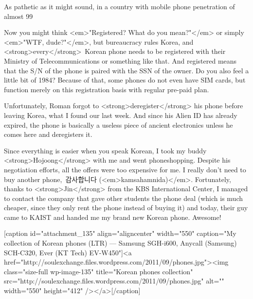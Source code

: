 \begin{post}
	\begin{content}
As pathetic as it might sound, in a country with mobile phone penetration of almost 99%



Now you might think <em>"Registered? What do you mean?"</em> or simply <em>"WTF, dude?"</em>, but bureaucracy rules Korea, and <strong>every</strong> Korean phone needs to be registered with their Ministry of Telecommunications or something like that. And registered means that the S/N of the phone is paired with the SSN of the owner. Do you also feel a little bit of 1984? Because of that, some phones do not even have SIM cards, but function merely on this registration basis with regular pre-paid plan.



Unfortunately, Roman forgot to <strong>deregister</strong> his phone before leaving Korea, what I found our last week. And since his Alien ID has already expired, the phone is basically a useless piece of ancient electronics unless he comes here and deregisters it.



Since everything is easier when you speak Korean, I took my buddy <strong>Hojoong</strong> with me and went phoneshopping. Despite his negotiation efforts, all the offers were too expensive for me. I really don't need to buy another phone, 감사합니다 (<em>kamsahamnida)</em>. Fortunately, thanks to <strong>Jin</strong> from the KBS International Center, I managed to contact the company that gave other students the phone deal (which is much cheaper, since they only rent the phone instead of buying it) and today, their guy came to KAIST and handed me my brand new Korean phone. Awesome!



[caption id="attachment_135" align="aligncenter" width="550" caption="My collection of Korean phones (LTR) — Samsung SGH-i600, Anycall (Samsung) SCH-C320, Ever (KT Tech) EV-W450"]<a href="http://soulexchange.files.wordpress.com/2011/09/phones.jpg"><img class="size-full wp-image-135" title="Korean phones collection" src="http://soulexchange.files.wordpress.com/2011/09/phones.jpg" alt="" width="550" height="412" /></a>[/caption]




\end{content}
\end{post}
